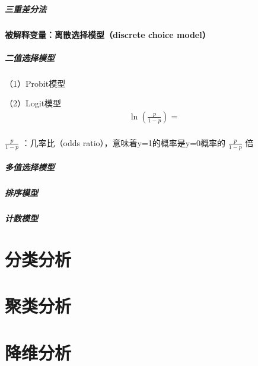 \documentclass[12pt]{book}
\begin{document}
\paragraph{三重差分法}


\subsubsection{被解释变量：离散选择模型（discrete choice model）}


\paragraph{二值选择模型}

（1）Probit模型

（2）Logit模型
\begin{gather*}
    \ln{\left(\frac{p}{1-p}\right)}=\\ 
\end{gather*}

$\frac{p}{1-p}$ ：几率比（odds ratio），意味着y=1的概率是y=0概率的 $\frac{p}{1-p}$ 倍

\paragraph{多值选择模型}


\paragraph{排序模型}


\paragraph{计数模型}










\chapter{分类分析}




\chapter{聚类分析}




\chapter{降维分析}
\end{document}
